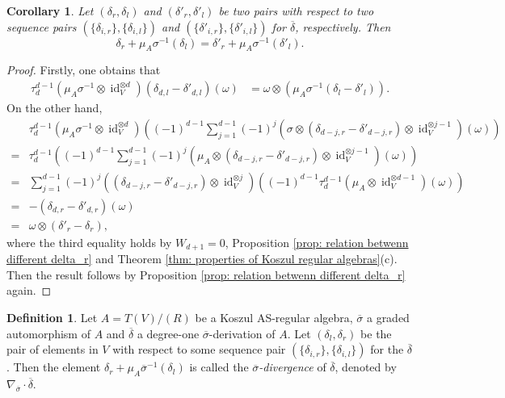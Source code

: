 \documentclass[a4paper,10pt]{amsart}
\newtheorem{corollary}[theorem]{Corollary}
\theoremstyle{definition}
\newtheorem{definition}[theorem]{Definition}
\numberwithin{equation}{section}
\DeclareMathOperator{\id}{id}
\begin{document}
\begin{corollary}\label{coro: relation between delta_r and delta l}
Let $(\delta_r,\delta_l)$ and $(\delta'_r,\delta'_l)$ be two pairs with respect to two sequence pairs $\left(\{\delta_{i,r}\},\{\delta_{i,l}\}\right)$ and $\left(\{\delta'_{i,r}\},\{\delta'_{i,l}\}\right)$ for $\overline{\delta}$, respectively. Then
$$
\delta_r+{\mu_A}\sigma^{-1}(\delta_l)=\delta'_r+\mu_A\sigma^{-1}(\delta'_l).
$$
\end{corollary}
\begin{proof}Firstly, one obtains that
\begin{align*}
\tau_d^{d-1}(\mu_A\sigma^{-1}\otimes\id_V^{\otimes d})(\delta_{d,l}-\delta'_{d,l})(\omega) &= \omega\otimes\left(\mu_A\sigma^{-1}(\delta_l-\delta'_l)\right).
\end{align*}
On the other hand,
\begin{align*}
&\tau_d^{d-1}(\mu_A\sigma^{-1}\otimes\id_V^{\otimes d})\left((-1)^{d-1}\sum_{j=1}^{d-1}(-1)^{j}\left(\sigma\otimes (\delta_{d-j,r}-\delta'_{d-j,r})\otimes\id_V^{\otimes j-1}\right)(\omega)\right)\\
=&\tau_d^{d-1}\left((-1)^{d-1}\sum_{j=1}^{d-1}(-1)^{j}\left(\mu_A\otimes (\delta_{d-j,r}-\delta'_{d-j,r})\otimes\id_V^{\otimes j-1}\right)(\omega)\right)\\
=&\sum_{j=1}^{d-1}(-1)^{j}\left( (\delta_{d-j,r}-\delta'_{d-j,r})\otimes\id_V^{\otimes j}\right)\left((-1)^{d-1}\tau_d^{d-1}(\mu_A\otimes\id_V^{\otimes d-1})(\omega)\right)\\
=&-(\delta_{d,r}-\delta'_{d,r})(\omega)\\
=&\omega\otimes(\delta'_r-\delta_r),
\end{align*}
where the third equality holds by $W_{d+1}=0$, Proposition \ref{prop: relation betwenn different delta_r} and Theorem \ref{thm: properties of Koszul regular algebras}(c). Then the result follows by Proposition \ref{prop: relation betwenn different delta_r} again.
\end{proof}

\begin{definition}
Let $A=T(V)/(R)$ be a Koszul AS-regular algebra, $\overline{\sigma}$ a graded automorphism of $A$ and $\overline{\delta}$ a degree-one $\overline{\sigma}$-derivation of $A$. Let $(\delta_l,\delta_r)$ be the pair of elements in $V$ with respect to some sequence pair $\left(\{\delta_{i,r}\},\{\delta_{i,l}\}\right)$ for the $\overline{\delta}$. Then the element $\delta_r+\mu_A\overline{\sigma}^{-1}(\delta_l)$ is called the \emph{$\overline{\sigma}$-divergence} of $\overline{\delta}$, denoted by $\nabla_{\overline{\sigma}}\cdot\overline{\delta}$.
\end{definition}
\end{document}

